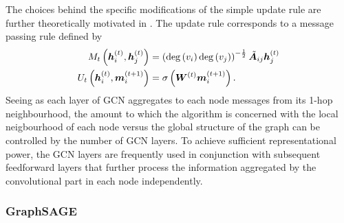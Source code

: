 The choices behind the specific modifications of the simple update rule are further theoretically motivated in \cite{kipf_semi-supervised_2017}. The update rule corresponds to a message passing rule defined by
\begin{equation}
	\begin{split}
		M_t \left( \bm{h}_i^{(t)}, \bm{h}_j^{(t)} \right) &= \left( \mathrm{deg} \left( v_i \right) \mathrm{deg} \left( v_j \right) \right)^{-\frac{1}{2}} \tilde{\bm{A}}_{ij} \bm{h}_j^{(t)} \\
		U_t \left( \bm{h}_i^{(t)}, \bm{m}_i^{(t+1)} \right) &= \sigma \left( \bm{W}^{(t)} \bm{m}_i^{(t+1)} \right). \\
	\end{split}
\end{equation}
Seeing as each layer of GCN aggregates to each node messages from its 1-hop neighbourhood, the amount to which the algorithm is concerned with the local neigbourhood of each node versus the global structure of the graph can be controlled by the number of GCN layers. To achieve sufficient representational power, the GCN layers are frequently used in conjunction with subsequent feedforward layers that further process the information aggregated by the convolutional part in each node independently.

\subsubsection{GraphSAGE}
